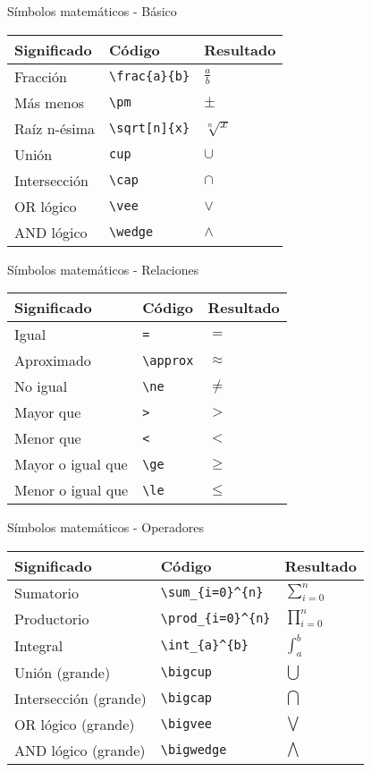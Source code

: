 \documentclass[
  ignorenonframetext,
]{beamer}
\begin{document}
\begin{frame}[fragile]{Símbolos matemáticos - Básico}
\protect\hypertarget{suxedmbolos-matemuxe1ticos---buxe1sico-1}{}

\begin{longtable}[]{@{}lll@{}}
\toprule
Significado & Código & Resultado\tabularnewline
\midrule
\endhead
Fracción & \texttt{\textbackslash{}frac\{a\}\{b\}} &
\(\frac{a}{b}\)\tabularnewline
Más menos & \texttt{\textbackslash{}pm} & \(\pm\)\tabularnewline
Raíz n-ésima & \texttt{\textbackslash{}sqrt{[}n{]}\{x\}} &
\(\sqrt[n]{x}\)\tabularnewline
Unión & \texttt{cup} & \(\cup\)\tabularnewline
Intersección & \texttt{\textbackslash{}cap} & \(\cap\)\tabularnewline
OR lógico & \texttt{\textbackslash{}vee} & \(\vee\)\tabularnewline
AND lógico & \texttt{\textbackslash{}wedge} & \(\wedge\)\tabularnewline
\bottomrule
\end{longtable}

\end{frame}

\begin{frame}[fragile]{Símbolos matemáticos - Relaciones}
\protect\hypertarget{suxedmbolos-matemuxe1ticos---relaciones}{}

\begin{longtable}[]{@{}lll@{}}
\toprule
Significado & Código & Resultado\tabularnewline
\midrule
\endhead
Igual & \texttt{=} & \(=\)\tabularnewline
Aproximado & \texttt{\textbackslash{}approx} &
\(\approx\)\tabularnewline
No igual & \texttt{\textbackslash{}ne} & \(\ne\)\tabularnewline
Mayor que & \texttt{\textgreater{}} & \(>\)\tabularnewline
Menor que & \texttt{\textless{}} & \(<\)\tabularnewline
Mayor o igual que & \texttt{\textbackslash{}ge} & \(\ge\)\tabularnewline
Menor o igual que & \texttt{\textbackslash{}le} & \(\le\)\tabularnewline
\bottomrule
\end{longtable}

\end{frame}

\begin{frame}[fragile]{Símbolos matemáticos - Operadores}
\protect\hypertarget{suxedmbolos-matemuxe1ticos---operadores}{}

\begin{longtable}[]{@{}lll@{}}
\toprule
Significado & Código & Resultado\tabularnewline
\midrule
\endhead
Sumatorio & \texttt{\textbackslash{}sum\_\{i=0\}\^{}\{n\}} &
\(\sum_{i=0}^{n}\)\tabularnewline
Productorio & \texttt{\textbackslash{}prod\_\{i=0\}\^{}\{n\}} &
\(\prod_{i=0}^{n}\)\tabularnewline
Integral & \texttt{\textbackslash{}int\_\{a\}\^{}\{b\}} &
\(\int_{a}^{b}\)\tabularnewline
Unión (grande) & \texttt{\textbackslash{}bigcup} &
\(\bigcup\)\tabularnewline
Intersección (grande) & \texttt{\textbackslash{}bigcap} &
\(\bigcap\)\tabularnewline
OR lógico (grande) & \texttt{\textbackslash{}bigvee} &
\(\bigvee\)\tabularnewline
AND lógico (grande) & \texttt{\textbackslash{}bigwedge} &
\(\bigwedge\)\tabularnewline
\bottomrule
\end{longtable}

\end{frame}
\end{document}
